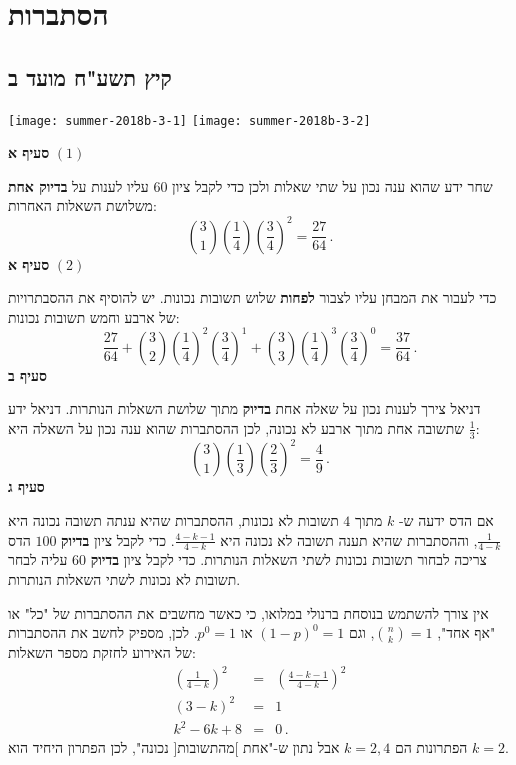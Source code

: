 
\chapter{הסתברות}



\section{קיץ תשע"ח מועד ב}

\begin{center}
\texttt{[image: summer-2018b-3-1]}
\texttt{[image: summer-2018b-3-2]}
\end{center}

\textbf{סעיף א}
$(1)$

שחר ידע שהוא ענה נכון על שתי שאלות ולכן כדי לקבל ציון
$60$
עליו לענות על 
\textbf{בדיוק אחת}
משלושת השאלות האחרות:
\[
{3 \choose 1}\left(\frac{1}{4}\right)\left(\frac{3}{4}\right)^2=\frac{27}{64}\,.
\]
\textbf{סעיף א}
$(2)$

כדי לעבור את המבחן עליו לצבור
\textbf{לפחות}
שלוש תשובות נכונות. יש להוסיף את ההסבתרויות של ארבע וחמש תשובות נכונות:
\[
\frac{27}{64}+{3 \choose 2}\left(\frac{1}{4}\right)^2\left(\frac{3}{4}\right)^1+{3 \choose 3}\left(\frac{1}{4}\right)^3\left(\frac{3}{4}\right)^0=\frac{37}{64}\,.
\]
\textbf{סעיף ב}

דניאל צירך לענות נכון על שאלה אחת 
\textbf{בדיוק}
מתוך שלושת השאלות הנותרות. דניאל ידע שתשובה אחת מתוך ארבע לא נכונה, לכן ההסתברות שהוא ענה נכון על השאלה היא
$\frac{1}{3}$:
\[
{3 \choose 1}\left(\frac{1}{3}\right)\left(\frac{2}{3}\right)^2=\frac{4}{9}\,.
\]
\textbf{סעיף ג}

אם הדס ידעה ש-%
$k$
מתוך 
$4$
תשובות לא נכונות, ההסתברות שהיא ענתה תשובה נכונה היא
$\frac{1}{4-k}$,
וההסתברות שהיא תענה תשובה לא נכונה היא
$\frac{4-k-1}{4-k}$.
כדי לקבל ציון 
\textbf{בדיוק}
$100$
הדס צריכה לבחור תשובות נכונות לשתי השאלות הנותרות. כדי לקבל ציון 
\textbf{בדיוק}
$60$
עליה לבחר תשובות לא נכונות לשתי השאלות הנותרות.

אין צורך להשתמש בנוסחת ברנולי במלואו, כי כאשר מחשבים את ההסתברות של "כל" או "אף אחד", 
${n\choose k}=1$,
וגם
$(1-p)^0=1$
או
$p^0=1$.
לכן, מספיק לחשב את ההסתברות של האירוע לחזקת מספר השאלות:
\begin{eqnarray*}
\left(\frac{1}{4-k}\right)^2 &=&\left(\frac{4-k-1}{4-k}\right)^2\\
(3-k)^2&=&1\\
k^2-6k+8&=& 0\,.
\end{eqnarray*}
הפתרונות הם 
$k=2,4$
אבל נתון ש-"אחת ]מהתשובות[ נכונה", לכן הפתרון היחיד הוא
$k=2$.

